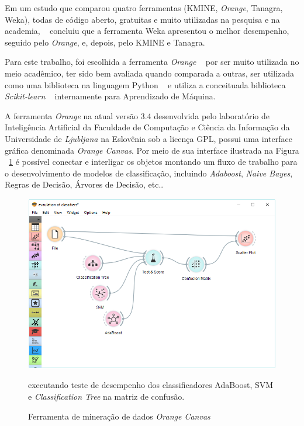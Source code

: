 Em um estudo que comparou quatro ferramentas (KMINE, \textit{Orange}, Tanagra, Weka), todas de código aberto, gratuitas e muito utilizadas na pesquisa e na academia, ~\cite{wahbeh2011comparison} concluiu que a ferramenta Weka apresentou o melhor desempenho, seguido pelo \textit{Orange}, e, depois, pelo KMINE e Tanagra.

Para este trabalho, foi escolhida a ferramenta \textit{Orange} ~\cite{JMLR:demsar13a} por ser muito utilizada no meio acadêmico, ter sido bem avaliada quando comparada a outras, ser utilizada como uma biblioteca na linguagem Python ~\cite{van2003python} e utiliza a conceituada biblioteca \textit{Scikit-learn} ~\cite{scikit-learn} internamente para Aprendizado de Máquina. 

A ferramenta \textit{Orange} na atual versão 3.4 desenvolvida pelo laboratório de Inteligência Artificial da Faculdade de Computação e Ciência da Informação da Universidade de \textit{Ljubljana} na Eslovênia sob a licença GPL, possui uma interface gráfica denominada \textit{Orange Canvas}. Por meio de sua interface ilustrada na Figura ~\ref{fig:orange_canvas} é possível conectar e interligar os objetos montando um fluxo de trabalho para o desenvolvimento de modelos de classificação, incluindo \textit{Adaboost}, \textit{Naive Bayes}, Regras de Decisão, Árvores de Decisão, etc..

\begin{figure}[H]
\begin{center}
    \includegraphics[scale=0.55]{figuras/orange_canvas.png}
\end{center}
\caption{Ferramenta de mineração de dados \textit{Orange Canvas}} executando teste de desempenho dos classificadores AdaBoost, SVM e \textit{Classification Tree} na matriz de confusão.  
\label{fig:orange_canvas}
\end{figure}

